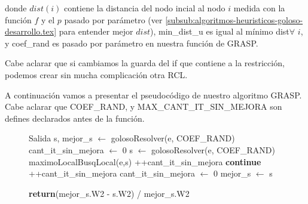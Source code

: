 donde $dist(i)$ contiene la distancia del nodo incial al nodo $i$ medida con la función $f$ y el $p$ pasado por parámetro (ver \ref{subsub:algoritmos-heuristicos-goloso-desarrollo.tex} para entender mejor $dist$), min\_dist\_u es igual al mínimo dist$\forall$ $i$, y coef\_rand es pasado por parámetro en nuestra función de GRASP.

Cabe aclarar que si cambiamos la guarda del if que contiene a la restricción, podemos crear sin mucha complicación otra RCL.

A continuación vamos a presentar el pseudocódigo de nuestro algoritmo GRASP. Cabe aclarar que COEF\_RAND, y MAX\_CANT\_IT\_SIN\_MEJORA son defines declarados antes de la función.

\begin{center}
 \begin{figure}[H]
  \begin{pseudo}
    \State Salida s, mejor\_s $\leftarrow$ golosoResolver(e, COEF\_RAND)
    \State cant\_it\_sin\_mejora $\leftarrow$ 0   
      \State s $\leftarrow$ golosoResolver(e, COEF\_RAND)
      \State maximoLocalBusqLocal(e,s)
	\State++cant\_it\_sin\_mejora
	\State \textbf{continue}
      \EndIf
	\State ++cant\_it\_sin\_mejora
      \Else
	\State cant\_it\_sin\_mejora $\leftarrow$ 0
      \EndIf
	\State mejor\_s $\leftarrow$ s
      \EndIf
    \EndWhile
    \EndProcedure
  \end{pseudo}
 \end{figure}
\end{center}

\begin{center}
 \begin{figure}[H]
  \begin{pseudo}
    \State \textbf{return}(mejor\_s.W2 - s.W2) / mejor\_s.W2
  \EndProcedure
  \end{pseudo}
 \end{figure}
\end{center}